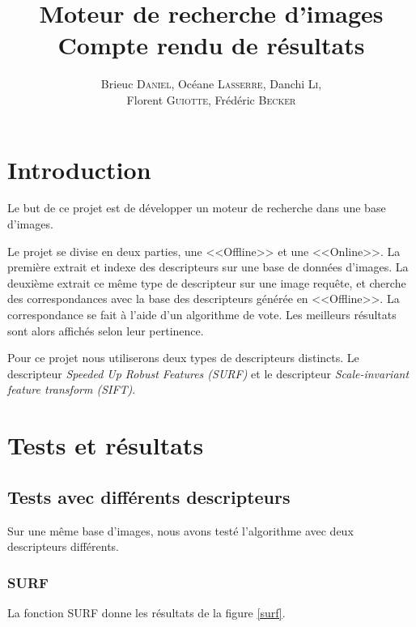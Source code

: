 \documentclass{article}
\author{Brieuc \textsc{Daniel}, Océane \textsc{Lasserre}, Danchi \textsc{Li}, \\ Florent \textsc{Guiotte}, Frédéric \textsc{Becker}}
\title{Moteur de recherche d'images \\ \Large{Compte rendu de résultats}}
\begin{document}
\maketitle
\tableofcontents

\section{Introduction}

Le but de ce projet est de développer un moteur de recherche dans une base d'images. 

Le projet se divise en deux parties, une <<Offline>> et une <<Online>>. La première extrait et indexe des descripteurs sur une base de données
d'images. La deuxième extrait ce même type de descripteur sur une image requête, et cherche des
correspondances avec la base des descripteurs générée en <<Offline>>. La correspondance se fait à l'aide d'un 
algorithme de vote. Les meilleurs résultats sont alors affichés selon leur pertinence. 

Pour ce projet nous utiliserons deux types de descripteurs distincts.
Le descripteur {\em Speeded Up Robust
Features (SURF)} et le descripteur {\em Scale-invariant feature transform (SIFT)}.

\section{Tests et résultats}
\subsection{Tests avec différents descripteurs}

Sur une même base d'images, nous avons testé l'algorithme avec deux descripteurs différents.

\subsubsection{SURF}

La fonction SURF donne les résultats de la figure \ref{surf}.
\end{document}
